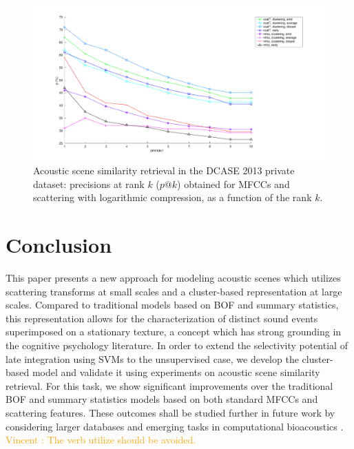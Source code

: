 \documentclass[smallextended]{svjour3}
\newcommand{\vl}[1]{\textcolor{orange}{Vincent : #1}}
\begin{document}

\begin{figure}[t]
\begin{center}
\includegraphics[width=\columnwidth]{figures/overall}
\caption{Acoustic scene similarity retrieval in the DCASE 2013 private dataset: precisions at rank $k$ ($p@k$) obtained for MFCCs and scattering with logarithmic compression, as a function of the rank $k$.}
\label{fig:ASS_1}
\end{center}
\end{figure}

\section{Conclusion}

This paper presents a new approach for modeling acoustic scenes which utilizes scattering transforms at small scales and a cluster-based representation at large scales. Compared to traditional models based on BOF and summary statistics, this representation allows for the characterization of distinct sound events superimposed on a stationary texture, a concept which has strong grounding in the cognitive psychology literature. In order to extend the selectivity potential of late integration using SVMs to the unsupervised case, we develop the cluster-based model and validate it using experiments on acoustic scene similarity retrieval. For this task, we show significant improvements over the traditional BOF and summary statistics models based on both standard MFCCs and scattering features.
These outcomes shall be studied further in future work by considering larger databases and emerging tasks in computational bioacoustics \cite{wimmer2013sampling}.
\vl{The verb utilize should be avoided.}
\end{document}
